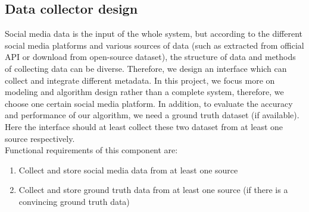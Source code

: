\subsection{Data collector design}
\label{sec:Data collector design}
Social media data is the input of the whole system, but according to the different social media platforms and various sources of data (such as extracted from official API or download from open-source dataset), the structure of data and methods of collecting data can be diverse. Therefore, we design an interface which can collect and integrate different metadata. In this project, we focus more on modeling and algorithm design rather than a complete system, therefore, we choose one certain social media platform. In addition, to evaluate the accuracy and performance of our algorithm, we need a ground truth dataset (if available). Here the interface should at least collect these two dataset from at least one source respectively.\\
Functional requirements of this component are:
\begin{enumerate}
    \item Collect and store social media data from at least one source
    \item Collect and store ground truth data from at least one source (if there is a convincing ground truth data)
\end{enumerate}
